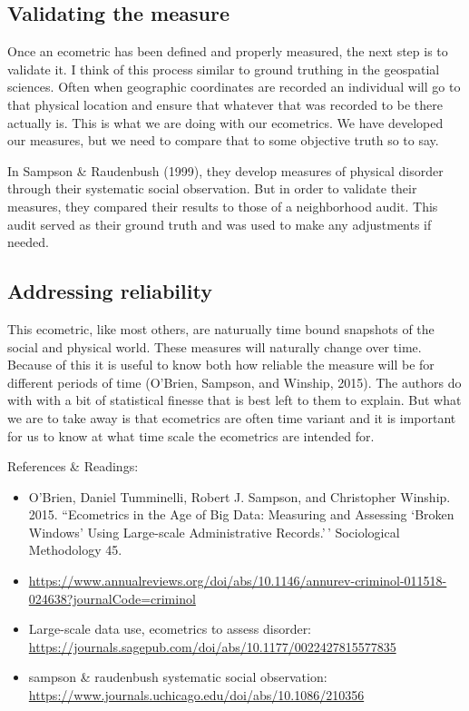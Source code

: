 \documentclass[
]{book}
\providecommand{\tightlist}{%
  \setlength{\itemsep}{0pt}\setlength{\parskip}{0pt}}
\begin{document}
\hypertarget{validating-the-measure}{%
\subsection{Validating the measure}\label{validating-the-measure}}

Once an ecometric has been defined and properly measured, the next step is to validate it. I think of this process similar to ground truthing in the geospatial sciences. Often when geographic coordinates are recorded an individual will go to that physical location and ensure that whatever that was recorded to be there actually is. This is what we are doing with our ecometrics. We have developed our measures, but we need to compare that to some objective truth so to say.

In Sampson \& Raudenbush (1999), they develop measures of physical disorder through their systematic social observation. But in order to validate their measures, they compared their results to those of a neighborhood audit. This audit served as their ground truth and was used to make any adjustments if needed.

\hypertarget{addressing-reliability}{%
\subsection{Addressing reliability}\label{addressing-reliability}}

This ecometric, like most others, are naturually time bound snapshots of the social and physical world. These measures will naturally change over time. Because of this it is useful to know both how reliable the measure will be for different periods of time (O'Brien, Sampson, and Winship, 2015). The authors do with with a bit of statistical finesse that is best left to them to explain. But what we are to take away is that ecometrics are often time variant and it is important for us to know at what time scale the ecometrics are intended for.

References \& Readings:

\begin{itemize}
\tightlist
\item
  O'Brien, Daniel Tumminelli, Robert J. Sampson, and Christopher Winship. 2015.
  ``Ecometrics in the Age of Big Data: Measuring and Assessing `Broken Windows'
  Using Large-scale Administrative Records.'\,' Sociological Methodology 45.
\item
  \url{https://www.annualreviews.org/doi/abs/10.1146/annurev-criminol-011518-024638?journalCode=criminol}
\item
  Large-scale data use, ecometrics to assess disorder: \url{https://journals.sagepub.com/doi/abs/10.1177/0022427815577835}
\item
  sampson \& raudenbush systematic social observation: \url{https://www.journals.uchicago.edu/doi/abs/10.1086/210356}
\end{itemize}
\end{document}
